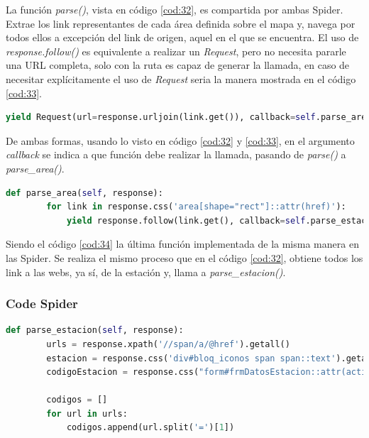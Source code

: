 La función \textit{parse()}, vista en código \ref{cod:32}, es compartida por ambas Spider. Extrae los link representantes de cada área definida sobre el mapa y, navega por todos ellos a excepción del link de origen, aquel en el que se encuentra.\newline
\newline
El uso de \textit{response.follow()} es equivalente a realizar un \textit{Request}, pero no necesita pararle una URL completa, solo con la ruta es capaz de generar la llamada, en caso de necesitar explícitamente el uso de \textit{Request} seria la manera mostrada en el código \ref{cod:33}.

\begin{lstlisting}[language=Python, caption={Alternativa a \textit{response.follow()}, mediante el uso de \textit{Request}}, label=cod:33]
	yield Request(url=response.urljoin(link.get()), callback=self.parse_area)
\end{lstlisting}

De ambas formas, usando lo visto en código \ref{cod:32} y \ref{cod:33}, en el argumento \textit{callback} se indica a que función debe realizar la llamada, pasando de \textit{parse()} a \textit{parse\_area()}.

\begin{lstlisting}[language=Python, caption={Función \textit{parse\_area()} Agua en Navarra Spiders}, label=cod:34]
	def parse_area(self, response):
		for link in response.css('area[shape="rect"]::attr(href)'):
			yield response.follow(link.get(), callback=self.parse_estacion)
\end{lstlisting}

Siendo el código \ref{cod:34} la última función implementada de la misma manera en las Spider. Se realiza el mismo proceso que en el código \ref{cod:32}, obtiene todos los link a las webs, ya sí, de la estación y, llama a \textit{parse\_estacion()}.

\subsubsection{Code Spider}

\begin{lstlisting}[language=Python, caption={Función \textit{parse\_estacion()} Agua en Navarra Code Spider}, label=cod:38]
	def parse_estacion(self, response):
		urls = response.xpath('//span/a/@href').getall()
		estacion = response.css('div#bloq_iconos span span::text').getall()
		codigoEstacion = response.css("form#frmDatosEstacion::attr(action)").get()
		
		codigos = []
		for url in urls:
			codigos.append(url.split('=')[1])
\end{lstlisting}

